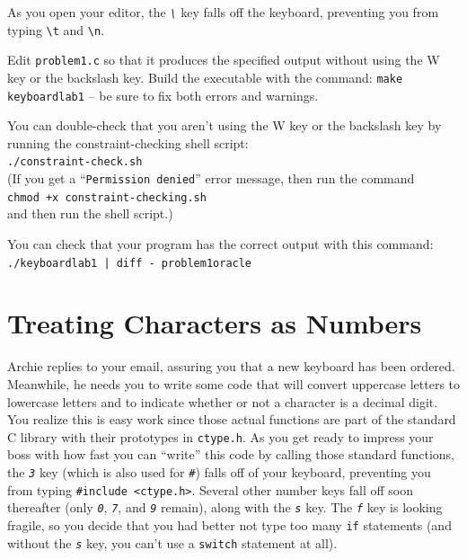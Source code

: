 As you open your editor, the \textit{\texttt{\textbackslash}} key falls off the
keyboard, preventing you from typing \texttt{\textbackslash t} and
\texttt{\textbackslash n}.

Edit \texttt{problem1.c} so that it produces the specified output without using
the W key or the backslash key. Build the executable with the command:
\texttt{make keyboardlab1} -- be sure to fix both errors and warnings.

You can double-check that you aren't using the W key or the backslash key by
running the constraint-checking shell script: \\
\texttt{./constraint-check.sh} \\
(If you get a ``\texttt{Permission denied}'' error message, then run the
command \\
\texttt{chmod +x constraint-checking.sh} \\
and then run the shell script.)

You can check that your program has the correct output with this command: \\
\texttt{./keyboardlab1 | diff - problem1oracle}


\section{Treating Characters as Numbers}

Archie replies to your email, assuring you that a new keyboard has been
ordered. Meanwhile, he needs you to write some code that will convert uppercase
letters to lowercase letters and to indicate whether or not a character is a
decimal digit. You realize this is easy work since those actual functions are
part of the standard C library with their prototypes in \texttt{ctype.h}. As
you get ready to impress your boss with how fast you can ``write'' this code by
calling those standard functions, the \textit{\texttt{3}} key (which is also
used for \textit{\texttt{\#}}) falls off of your keyboard, preventing you from
typing \lstinline{#include <ctype.h>}. Several other number keys fall off soon
thereafter (only \textit{\texttt{0}}, \textit{\texttt{7}}, and
\textit{\texttt{9}} remain), along with the \textit{\texttt{s}} key. The
\textit{\texttt{f}} key is looking fragile, so you decide that you had better
not type too many \lstinline{if} statements (and without the
\textit{\texttt{s}} key, you can't use a \lstinline{switch} statement at all).

